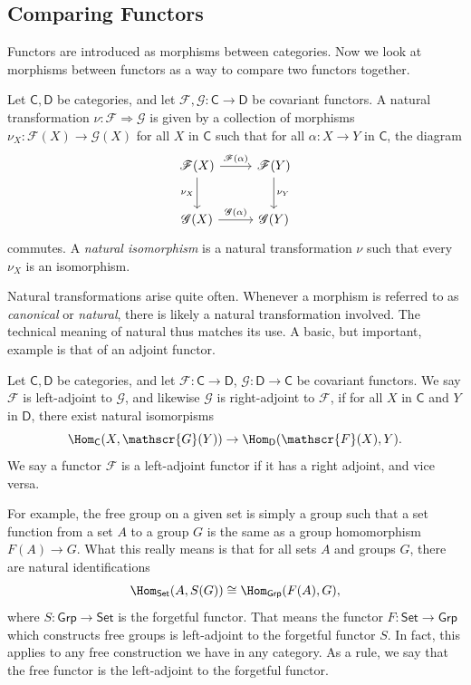 \subsection{Comparing Functors}
Functors are introduced as morphisms between categories. Now we look at morphisms between functors as a way to compare two functors together.
\begin{definition}\label{dfn:8.6}
	Let $\mathsf{C} ,\mathsf{D} $ be categories, and let $\mathscr{F} ,\mathscr{G} : \mathsf{C}  \to \mathsf{D}  $ be covariant functors. A natural transformation $\nu : \mathscr{F} \Rightarrow \mathscr{G} $ is given by a collection of morphisms $\nu_X : \mathscr{F} (X) \to \mathscr{G} (X)$ for all $X$ in $\mathsf{C} $ such that for all $\alpha : X \to Y$ in $\mathsf{C} $, the diagram
	\[\begin{tikzcd}[row sep = 2.5em, column sep = 2.5em]
		\mathscr{F} (X)\arrow[r, "\mathscr{F} (\alpha )"]\arrow[d, "\nu_X"']&\mathscr{F}(Y)\arrow[d, "\nu_Y"]\\
		\mathscr{G} (X)\arrow[r, "\mathscr{G} (\alpha )"]&\mathscr{G} (Y)
	\end{tikzcd}\]
	commutes. A \emph{natural isomorphism} is a natural transformation $\nu $ such that every $\nu_X$ is an isomorphism.
\end{definition}

Natural transformations arise quite often. Whenever a morphism is referred to as \emph{canonical} or \emph{natural}, there is likely a natural transformation involved. The technical meaning of natural thus matches its use. A basic, but important, example is that of an adjoint functor.

\begin{definition}\label{dfn:8.7}
	Let $\mathsf{C} ,\mathsf{D} $ be categories, and let $\mathscr{F} : \mathsf{C}  \to \mathsf{D} $, $\mathscr{G} : \mathsf{D}  \to \mathsf{C} $ be covariant functors. We say $\mathscr{F} $ is left-adjoint to $\mathscr{G} $, and likewise $\mathscr{G} $ is right-adjoint to $\mathscr{F} $, if for all $X$ in $\mathsf{C} $ and $Y$ in $\mathsf{D} $, there exist natural isomorpisms
	\[
		\Hom_{\mathsf{C} }(X, \mathscr{G} (Y)) \to \Hom_{\mathsf{D} }(\mathscr{F} (X), Y) 
	.\]
	We say a functor $\mathscr{F} $ is a left-adjoint functor if it has a right adjoint, and vice versa.
\end{definition}

For example, the free group on a given set is simply a group such that a set function from a set $A$ to a group $G$ is the same as a group homomorphism $F(A)\to G$. What this really means is that for all sets $A$ and groups $G$, there are natural identifications
\[
	\Hom_{\mathsf{Set} }(A, S(G)) \cong \Hom_{\mathsf{Grp} }(F(A), G) 
,\]
where $S : \mathsf{Grp}  \to \mathsf{Set} $ is the forgetful functor. That means the functor $F : \mathsf{Set}  \to \mathsf{Grp} $ which constructs free groups is left-adjoint to the forgetful functor $S$. In fact, this applies to any free construction we have in any category. As a rule, we say that the free functor is the left-adjoint to the forgetful functor.

